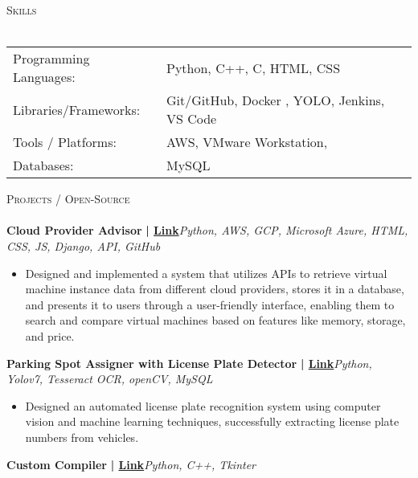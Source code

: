 \documentclass[a4paper]{article}
\newcommand{\lineunder} {
    \vspace*{-8pt} \\
    \hspace*{-18pt} \hrulefill \\
}
\newcommand{\header} [1] {
    {\hspace*{-18pt}\vspace*{6pt} \textsc{#1}}
    \vspace*{-6pt} \lineunder
}
\begin{document}
%
%
  \header{Skills}
  \vspace{1mm}
  \begin{longtable}{p{4cm}p{12cm}}
  Programming Languages: & Python, C++, C, HTML, CSS \\
  Libraries/Frameworks: & Git/GitHub, Docker , YOLO, Jenkins, VS Code \\
  Tools / Platforms: & AWS, VMware Workstation, \\
  Databases: & MySQL \\
  \end{longtable}
  \vspace{1mm}

      \header{Projects / Open-Source}
      \vspace{1mm}
      {\textbf{Cloud Provider Advisor}}\textbf{ | \href{https://github.com/Kunal2703/Cloud-Provider-Advisor}{Link}}\hfill{\sl Python, AWS, GCP, Microsoft Azure, HTML, CSS, JS, Django, API, GitHub}\\
          \vspace{-3mm}
\begin{itemize} \itemsep -3pt
\item[] Designed and implemented a system that utilizes APIs to retrieve virtual machine instance data from different cloud providers, stores it in a database, and presents it to users through a user-friendly interface, enabling them to search and compare virtual machines based on features like memory, storage, and price.
\end{itemize}
          \vspace*{3mm}
      {\textbf{Parking Spot Assigner with License Plate Detector}}\textbf{ | \href{https://github.com/Kunal2703/Parking-Spot-Assigner-with-License-Plate-Detector}{Link}}\hfill{\sl Python, Yolov7, Tesseract OCR, openCV, MySQL}\\
          \vspace{-3mm}
\begin{itemize} \itemsep -3pt
\item[] Designed an automated license plate recognition system using computer vision and machine learning techniques, successfully extracting license plate numbers from vehicles.
\end{itemize}
          \vspace*{3mm}
      {\textbf{Custom Compiler}}\textbf{ | \href{https://github.com/Kunal2703/Build-our-own-Compiler}{Link}}\hfill{\sl Python, C++, Tkinter}\\
\end{document}
